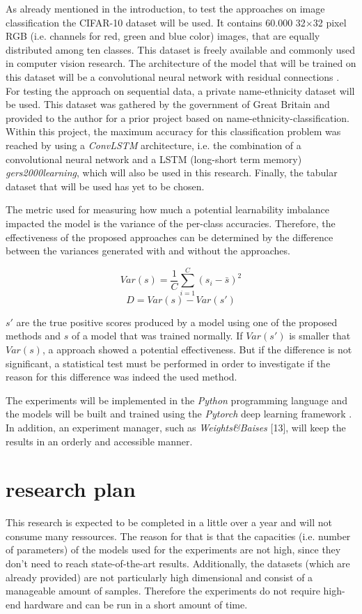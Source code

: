 \documentclass[journal]{IEEEtran}
\begin{document}
As already mentioned in the introduction, to test the approaches on image classification the CIFAR-10 dataset will be used.
It contains 60.000 32$\times$32 pixel RGB (i.e. channels for red, green and blue color) images, that are equally distributed among ten classes.
This dataset is freely available and commonly used in computer vision research.
The architecture of the model that will be trained on this dataset will be a convolutional neural network \cite{lecun1989backpropagation} with residual connections \cite{he2016deep}.
For testing the approach on sequential data, a private name-ethnicity dataset will be used.
This dataset was gathered by the government of Great Britain and provided to the author for a prior project based on name-ethnicity-classification.
Within this project, the maximum accuracy for this classification problem was reached by using a \emph{ConvLSTM} architecture, i.e. the combination of a convolutional neural network and a LSTM (long-short term memory) \emph{gers2000learning}, which will also be used in this research. 
Finally, the tabular dataset that will be used has yet to be chosen.

The metric used for measuring how much a potential learnability imbalance impacted the model is the variance of the per-class accuracies.
Therefore, the effectiveness of the proposed approaches can be determined by the difference between the variances generated with and without the approaches.

\[ Var(s) = \frac{1}{C} \sum_{i=1}^{C} (s_i - \bar{s})^2 \]
\[ D = Var(s) - Var(s') \]

$s'$ are the true positive scores produced by a model using one of the proposed methods and $s$ of a model that was trained normally. 
If $Var(s')$ is smaller that $Var(s)$, a approach showed a potential effectiveness.
But if the difference is not significant, a statistical test must be performed in order to investigate if the reason for this difference was indeed the used method.

The experiments will be implemented in the \emph{Python} programming language and the models will be built and trained using the \emph{Pytorch} deep learning framework \cite{paszke2019pytorch}.
In addition, an experiment manager, such as \emph{Weights\&Baises} [13], will keep the results in an orderly and accessible manner.

\section{research plan}
This research is expected to be completed in a little over a year and will not consume many ressources.
The reason for that is that the capacities (i.e. number of parameters) of the models used for the experiments are not high, since they don't need to reach state-of-the-art results.
Additionally, the datasets (which are already provided) are not particularly high dimensional and consist of a manageable amount of samples.
Therefore the experiments do not require high-end hardware and can be run in a short amount of time.
\end{document}
